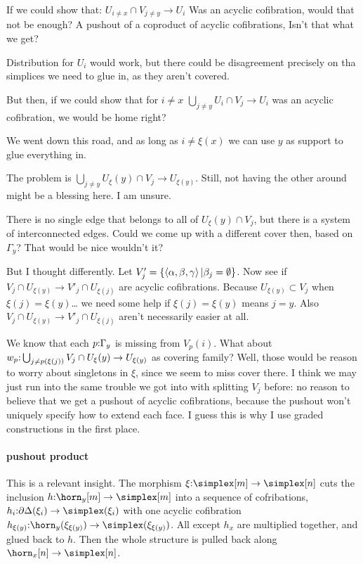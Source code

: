 \documentclass[csh.tex]{subfiles}
\begin{document}
If we could show that:
$U_{i\neq x}\cap V_{j\neq y} \to U_i$
Was an acyclic cofibration, would that not be enough?
A pushout of a coproduct of acyclic cofibrations,
Isn't that what we get?

Distribution for $U_i$ would work, but there could be disagreement precisely
on tha simplices we need to glue in, as they aren't covered.

But then, if we could show that for $i\neq x$
$\bigcup_{j\neq y} U_i\cap V_j \to U_i$
was an acyclic cofibration, we would be home right?

We went down this road, and as long as $i\neq \xi(x)$
we can use $y$ as support to glue everything in.

The problem is $\bigcup_{j\neq y} U_\xi(y)\cap V_j \to U_{\xi(y)}$.
Still, not having the other around might be a blessing here.
I am unsure.

There is no single edge that belongs to all of $U_\xi(y)\cap V_j$,
but there is a system of interconnected edges.
Could we come up with a different cover then, based on $\Gamma_y$?
That would be nice wouldn't it?

But I thought differently.
Let $V'_j = \left\{\left\langle \alpha,\beta,\gamma \right\rangle| \beta_j= \emptyset\right\}$.
Now see if $V_j \cap U_{\xi(y)} \to V'_j \cap U_{\xi(j)}$ are acyclic 
cofibrations. Because $U_{\xi(y)} \subset V_j$ when $\xi(j)=\xi(y)$\dots
we need some help if $\xi(j) = \xi(y)$ means $j=y$.
Also $V_j \cap U_{\xi(y)} \to V'_j \cap U_{\xi(j)}$ aren't necessarily easier at
all.

We know that each $p\mathord : \Gamma_y$ is missing from $V_p(i)$.
What about $w_p\mathord : \bigcup_{j\neq p(\xi(j)) } V_j\cap U_\xi(y)\to U_{\xi(y)}$ as 
covering family?
Well, those would be reason to worry about singletons in $\xi$, since we seem to 
miss cover there.
I think we may just run into the same trouble we got into with splitting $V_j$
before: no reason to believe that we get a pushout of acyclic cofibrations,
because the pushout won't uniquely specify how to extend each face. I guess
this is why I use graded constructions in the first place.

\paragraph{pushout product}
This is a relevant insight. The morphism $\xi\of \simplex[m]\to\simplex[n]$ cuts
the inclusion $h\of\horn_y[m]\to\simplex[m]$ into a sequence of cofribations,
$h_i\of\cycle(\xi_i)\to \simplex(\xi_i)$ with one acyclic cofibration 
$h_{\xi(y)}\of \horn_y(\xi_{\xi(y)})\to\simplex(\xi_{\xi(y)})$. All except $h_x$
 are multiplied together, and glued back to $h$. Then the whole structure is 
pulled back along $\horn_x[n]\to\simplex[n]$.
\end{document}
